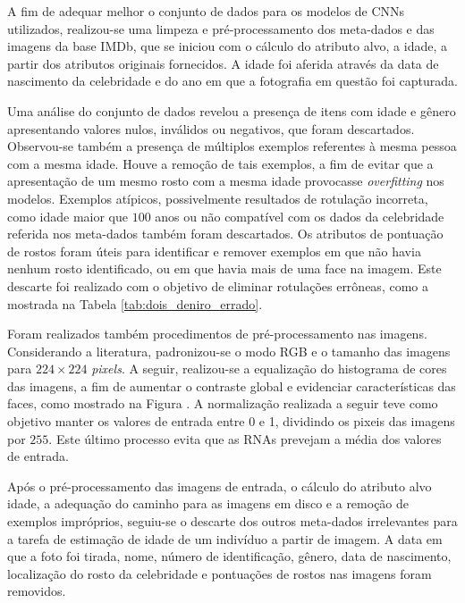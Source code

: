A fim de adequar melhor o conjunto de dados para os modelos de CNNs utilizados, realizou-se uma limpeza e pré-processamento dos meta-dados e das imagens da base IMDb, que se iniciou com o cálculo do atributo alvo, a idade, a partir dos atributos originais fornecidos. A idade foi aferida através da data de nascimento da celebridade e do ano em que a fotografia em questão foi capturada.

Uma análise do conjunto de dados revelou a presença de itens com idade e gênero apresentando valores nulos, inválidos ou negativos, que foram descartados. Observou-se também a presença de múltiplos exemplos referentes à mesma pessoa com a mesma idade. Houve a remoção de tais exemplos, a fim de evitar que a apresentação de um mesmo rosto com a mesma idade provocasse \emph{overfitting} nos modelos. Exemplos atípicos, possivelmente resultados de rotulação incorreta, como idade maior que $100$ anos ou não compatível com os dados da celebridade referida nos meta-dados também foram descartados. Os atributos de pontuação de rostos foram úteis para identificar e remover exemplos em que não havia nenhum rosto identificado, ou em que havia mais de uma face na imagem. Este descarte foi realizado com o objetivo de eliminar rotulações errôneas, como a mostrada na Tabela \ref{tab:dois_deniro_errado}.

Foram realizados também procedimentos de pré-processamento nas imagens. Considerando a literatura, padronizou-se o modo RGB e o tamanho das imagens para $224 \times 224$ \emph{pixels}. A seguir, realizou-se a equalização do histograma de cores das imagens, a fim de aumentar o contraste global e evidenciar características das faces, como mostrado na Figura . A normalização realizada a seguir teve como objetivo manter os valores de entrada entre 0 e 1, dividindo os pixeis das imagens por $255$. Este último processo evita que as RNAs prevejam a média dos valores de entrada.

Após o pré-processamento das imagens de entrada, o cálculo do atributo alvo idade, a adequação do caminho para as imagens em disco e a remoção de exemplos impróprios, seguiu-se o descarte dos outros meta-dados irrelevantes para a tarefa de estimação de idade de um indivíduo a partir de imagem. A data em que a foto foi tirada, nome, número de identificação, gênero, data de nascimento, localização do rosto da celebridade e pontuações de rostos nas imagens foram removidos.

